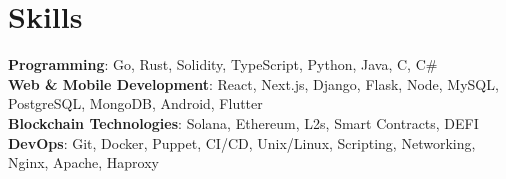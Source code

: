 
\section{Skills}

\begin{itemize}[leftmargin=0.15in, label={}]

\small{\item{\textbf{Programming}{: Go, Rust, Solidity, TypeScript, Python, Java, C, C\# } \\

\textbf{Web \& Mobile Development}{: React, Next.js, Django, Flask, Node, MySQL, PostgreSQL, MongoDB, Android, Flutter} \\

\textbf{Blockchain Technologies}{: Solana, Ethereum, L2s, Smart Contracts, DEFI} \\

\textbf{DevOps}{: Git, Docker, Puppet, CI/CD, Unix/Linux, Scripting, Networking, Nginx, Apache, Haproxy} \\
}}

\end{itemize}